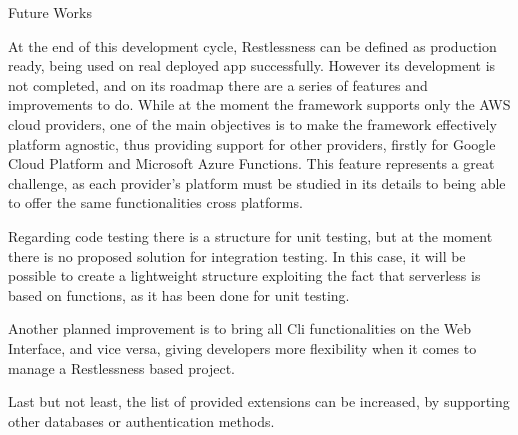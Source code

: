 \begin{chapter}{Future Works}

    At the end of this development cycle, Restlessness can be defined as production
    ready, being used on real deployed app successfully.
    However its development is not completed, and on its roadmap there are a series
    of features and improvements to do. While at the moment the framework supports
    only the AWS cloud providers, one of the main objectives is to make the framework
    effectively platform agnostic, thus providing support for other providers, firstly
    for Google Cloud Platform and Microsoft Azure Functions. This feature represents
    a great challenge, as each provider's platform must be studied in its details
    to being able to offer the same functionalities cross platforms.

    Regarding code testing there is a structure for unit testing, but at the moment
    there is no proposed solution for integration testing. In this case, it will be
    possible to create a lightweight structure exploiting the fact that serverless
    is based on functions, as it has been done for unit testing.

    Another planned improvement is to bring all Cli functionalities on the Web
    Interface, and vice versa, giving developers more flexibility when it comes
    to manage a Restlessness based project.

    Last but not least, the list of provided extensions can be increased, by
    supporting other databases or authentication methods.

\end{chapter}